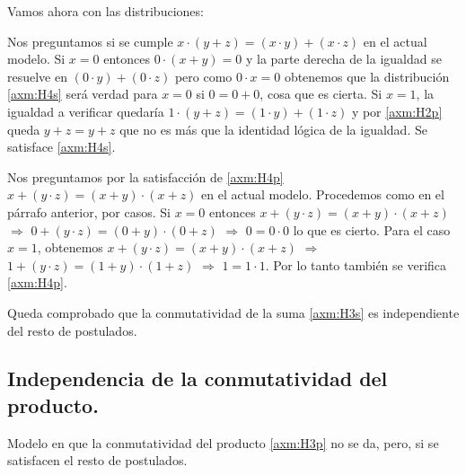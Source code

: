 	Vamos ahora con las distribuciones:



	Nos preguntamos si se cumple \( x \cdot ( y + z ) = ( x \cdot y ) + ( x
\cdot z ) \) en el actual modelo. Si \(x = 0\) entonces \( 0 \cdot (x + y) =
0 \) y la parte derecha de la igualdad se resuelve en \( ( 0 \cdot y ) + ( 0
\cdot z ) \) pero como \( 0 \cdot x = 0 \) obtenemos que la distribución
\ref{axm:H4s} será verdad para \(x = 0\) si \( 0 = 0 + 0 \), cosa que es
cierta. Si \( x = 1 \), la igualdad a verificar quedaría \( 1 \cdot ( y + z )
= ( 1 \cdot y ) + ( 1 \cdot z ) \) y por \ref{axm:H2p} queda \( y + z  =  y
+ z \) que no es más que la identidad lógica de la igualdad. Se satisface
\ref{axm:H4s}.



	Nos preguntamos por la satisfacción de \ref{axm:H4p} \( x + ( y \cdot z
) = ( x + y ) \cdot ( x + z ) \) en el actual modelo. Procedemos como en el
párrafo anterior, por casos. Si \(x = 0\) entonces \( x + ( y \cdot z ) = ( x
+ y ) \cdot ( x + z ) \) \(\Longrightarrow\) \(0 + ( y \cdot z ) = ( 0 + y )
\cdot ( 0 + z )\) \(\Longrightarrow\) \( 0 = 0 \cdot 0\) lo que es cierto.
Para el caso \(x = 1\),  obtenemos \( x + ( y \cdot z ) = ( x + y ) \cdot ( x
+ z ) \) \(\Longrightarrow\) \( 1 + ( y \cdot z ) = ( 1 + y ) \cdot ( 1 + z
)\) \(\Longrightarrow\) \( 1 = 1 \cdot 1 \). Por lo tanto también se verifica
\ref{axm:H4p}.



	Queda comprobado que la conmutatividad de la suma \ref{axm:H3s} es independiente del resto de postulados.



\subsection{Independencia de la conmutatividad del producto.}



	Modelo en que la conmutatividad del producto \ref{axm:H3p} no se da,
pero, si se satisfacen el resto de postulados.




